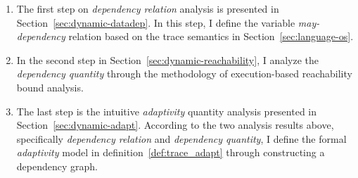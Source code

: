  \begin{enumerate}
 \item The first step on \emph{dependency relation} analysis is presented in Section~\ref{sec:dynamic-datadep}.
 In this step, I define the variable \emph{may-dependency} relation based on the trace semantics in Section~\ref{sec:language-os}.
 \item In the second step in Section~\ref{sec:dynamic-reachability}, I analyze the \emph{dependency quantity} through the methodology of execution-based reachability bound analysis.
 \item The last step is the intuitive \emph{adaptivity} quantity analysis presented in Section~\ref{sec:dynamic-adapt}.
 According to the two analysis results above, specifically \emph{dependency relation} and \emph{dependency quantity},
 I define the formal \emph{adaptivity} model in definition~\ref{def:trace_adapt} through 
 constructing a dependency graph.
 \end{enumerate}


